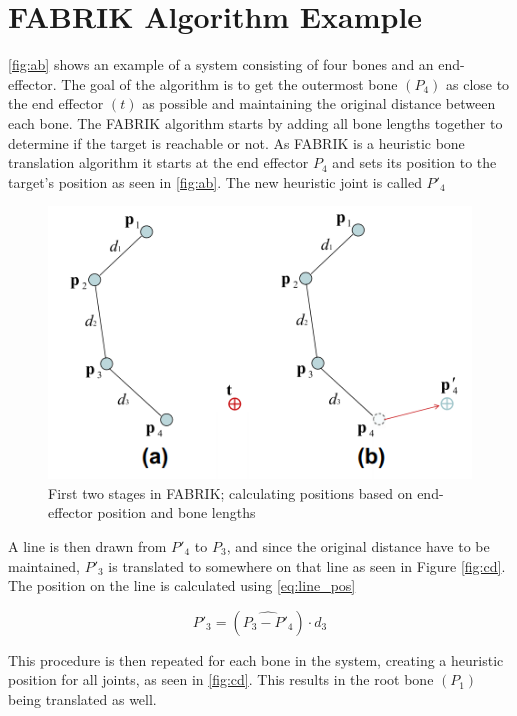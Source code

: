 \section*{FABRIK Algorithm Example}
\autoref{fig:ab} shows an example of a system consisting of four bones and an end-effector. The goal of the algorithm is to get the outermost bone $ (P_4) $ as close to the end effector $ (t) $ as possible and maintaining the original distance between each bone. 
The FABRIK algorithm starts by adding all bone lengths together to determine if the target is reachable or not. 
As FABRIK is a heuristic bone translation algorithm it starts at the end effector $ P_4 $ and sets its position to the target's position as seen in \autoref{fig:ab}. The new heuristic joint is called $ P'_4 $ 

\begin{figure}[H]
	\centering
	\includegraphics[width=\textwidth]{FABRIK/ab}
	\caption{First two stages in FABRIK; calculating positions based on end-effector position and bone lengths}
	\label{fig:ab}
\end{figure}

A line is then drawn from $ P'_4 $ to $ P_3 $, and since the original distance have to be maintained, $ P'_3 $ is translated to somewhere on that line as seen in Figure \ref{fig:cd}. The position on the line is calculated using \autoref{eq:line_pos}

\begin{equation}\label{eq:line_pos}
	P'_3 = (\hat{P_3 - P'_4}) \cdot d_{3}
\end{equation}


This procedure is then repeated for each bone in the system, creating a heuristic position for all joints, as seen in \autoref{fig:cd}. This results in the root bone $ (P_1) $ being translated as well. 

